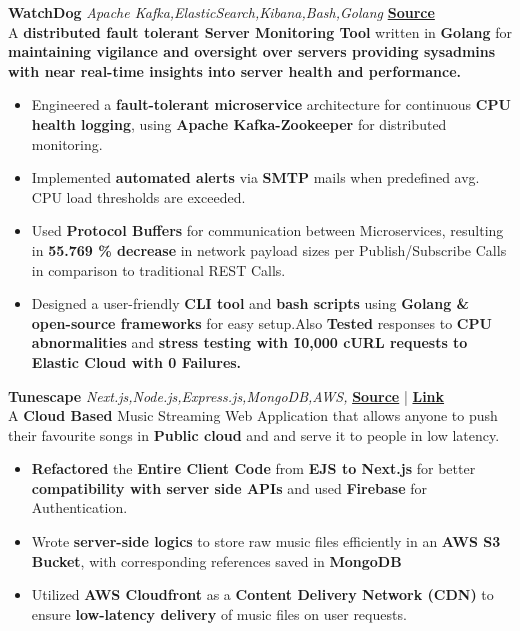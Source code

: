 
\vspace{1pt}
{\textbf{WatchDog}} {\sl Apache Kafka,ElasticSearch,Kibana,Bash,Golang} \hfill \textbf{\href{https://github.com/zakhaev26/WatchDog}{\textbf{\textcolor{linkcolor}{Source}}}} \\[1.7pt]

A \textbf{distributed fault tolerant Server Monitoring Tool} written in \textbf{Golang} for \textbf{maintaining vigilance and oversight over servers providing sysadmins with near real-time insights into server health and performance.}\\
\vspace{-0.5em}
\begin{itemize}
    \itemsep-0.2em
    \item Engineered a \textbf{fault-tolerant microservice} architecture for continuous \textbf{CPU health logging}, using \textbf{Apache Kafka-Zookeeper} for distributed monitoring.
    \item Implemented \textbf{automated alerts} via \textbf{SMTP} mails when predefined avg. CPU load thresholds are exceeded.
    \item Used \textbf{Protocol Buffers} for communication between Microservices, resulting in \textbf{55.769 \% decrease} in network payload sizes per Publish/Subscribe Calls in comparison to traditional REST Calls. 
    \item Designed a user-friendly \textbf{CLI tool} and \textbf{bash scripts} using \textbf{Golang \& open-source frameworks} for easy setup.Also \textbf{Tested} responses to \textbf{CPU abnormalities} and \textbf{stress testing with \~10,000 cURL requests to Elastic Cloud with 0 Failures.}
\end{itemize}
\vspace*{-3pt}

{\textbf{Tunescape}} {\sl Next.js,Node.js,Express.js,MongoDB,AWS,} \hfill \textbf{\href{https://github.com/zakhaev26/Tunescape}{\textbf{\textcolor{linkcolor}{Source}}}} | \textbf{\href{https://github.com/zakhaev26/WatchDog}{\textbf{\textcolor{linkcolor}{Link}}}} \\[1.7pt]

A \textbf{Cloud Based} Music Streaming Web Application that allows anyone to push their favourite songs in \textbf{Public cloud} and and serve it to people in low latency.\\
\vspace{-0.3em}
\begin{itemize}
    \itemsep-0.2em
    \item \textbf{Refactored} the \textbf{Entire Client Code} from \textbf{EJS to Next.js} for better \textbf{compatibility with server side APIs} and used \textbf{Firebase} for Authentication.
    \item Wrote \textbf{server-side logics} to store raw music files efficiently in an \textbf{AWS S3 Bucket}, with corresponding references saved in \textbf{MongoDB}
    \item Utilized \textbf{AWS Cloudfront} as a \textbf{Content Delivery Network (CDN)} to ensure \textbf{low-latency delivery} of music files on user requests.
\end{itemize}
\vspace*{-1pt}

